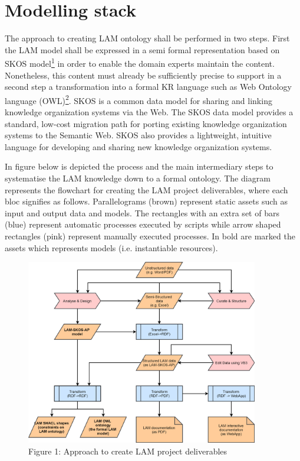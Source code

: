 \hypertarget{ariaid-title1}{%
\section{Modelling stack}\label{ariaid-title1}}

The approach to creating LAM ontology shall be performed in two steps.
First the LAM model shall be expressed in a semi formal representation
based on SKOS model\protect\hyperlink{fntarg_1}{\textsuperscript{1}} in
order to enable the domain experts maintain the content. Nonetheless,
this content must already be sufficiently precise to support in a second
step a transformation into a formal KR language such as Web Ontology
language (OWL)\protect\hyperlink{fntarg_2}{\textsuperscript{2}}. SKOS is
a common data model for sharing and linking knowledge organization
systems via the Web. The SKOS data model provides a standard, low-cost
migration path for porting existing knowledge organization systems to
the Semantic Web. SKOS also provides a lightweight, intuitive language
for developing and sharing new knowledge organization systems.

In figure below is depicted the process and the main intermediary steps
to systematise the LAM knowledge down to a formal ontology. The diagram
represents the flowchart for creating the LAM project deliverables,
where each bloc signifies as follows. Parallelograms (brown) represent
static assets such as input and output data and models. The rectangles
with an extra set of bars (blue) represent automatic processes executed
by scripts while arrow shaped rectangles (pink) represent manually
executed processes. In bold are marked the assets which represents
models (i.e. instantiable resources).

\begin{figure}
\hypertarget{ont-req-modelling-stack__process-fig}{%
\centering
\includegraphics[width=4in,height=\textheight]{../../docs/lam vision.png}
\caption{{Figure{ 1}: }Approach to create LAM project
deliverables}\label{ont-req-modelling-stack__process-fig}
}
\end{figure}

